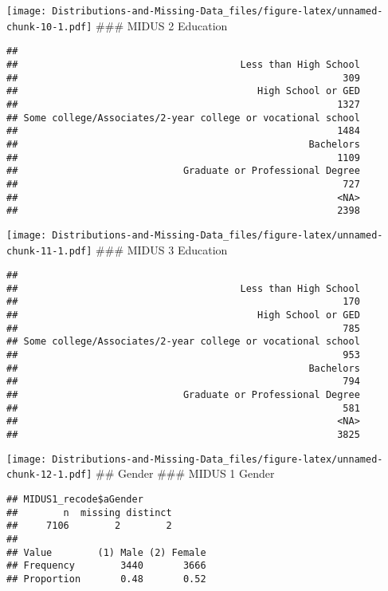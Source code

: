 \documentclass[
]{article}
\begin{document}
\texttt{[image: Distributions-and-Missing-Data\_files/figure-latex/unnamed-chunk-10-1.pdf]}
\#\#\# MIDUS 2 Education

\begin{verbatim}
## 
##                                       Less than High School 
##                                                         309 
##                                          High School or GED 
##                                                        1327 
## Some college/Associates/2-year college or vocational school 
##                                                        1484 
##                                                   Bachelors 
##                                                        1109 
##                             Graduate or Professional Degree 
##                                                         727 
##                                                        <NA> 
##                                                        2398
\end{verbatim}

\texttt{[image: Distributions-and-Missing-Data\_files/figure-latex/unnamed-chunk-11-1.pdf]}
\#\#\# MIDUS 3 Education

\begin{verbatim}
## 
##                                       Less than High School 
##                                                         170 
##                                          High School or GED 
##                                                         785 
## Some college/Associates/2-year college or vocational school 
##                                                         953 
##                                                   Bachelors 
##                                                         794 
##                             Graduate or Professional Degree 
##                                                         581 
##                                                        <NA> 
##                                                        3825
\end{verbatim}

\texttt{[image: Distributions-and-Missing-Data\_files/figure-latex/unnamed-chunk-12-1.pdf]}
\#\# Gender \#\#\# MIDUS 1 Gender

\begin{verbatim}
## MIDUS1_recode$aGender 
##        n  missing distinct 
##     7106        2        2 
##                                 
## Value        (1) Male (2) Female
## Frequency        3440       3666
## Proportion       0.48       0.52
\end{verbatim}
\end{document}
